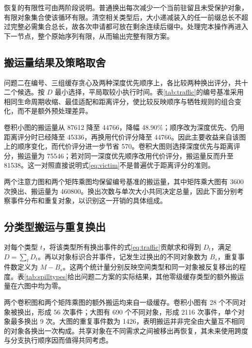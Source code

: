 恢复的有限性可由两阶段说明。普通换出每次减少一个当前驻留且未受保护对象，有限对象集合使该循环有限。清空相关类型后，大小递减装入的任一前缀总长不超过完整必需集合总长，故各次申请都可放在剩余连续后缀中。处理完本操作再进入下一节点，整个原始序列有限，从而输出完整有限方案。

\subsection{搬运量结果及策略取舍}
问题二在编号、三组缓存贪心及两种深度优先顺序上，各比较两种换出评分，共十二个候选。按 $D$ 最小选择，平局取较小执行时间。表\ref{tab:traffic}的编号基准采用相同生命周期收缩、最佳适配和距离评分，使比较反映顺序与牺牲规则的组合变化，而不是额外预处理差异。
\begin{table}[H]\centering\caption{问题二的额外搬运量与换出次数}\label{tab:traffic}\small
\end{table}

卷积小图的搬运量从 87612 降至 44766，降幅 48.90\%；顺序改为深度优先、仍用距离评分时已经降至 45336，再换用代价评分降至 44766。因此主要收益来自该图上的顺序变化，而代价评分进一步节省 570。卷积大图则选择深度优先与距离评分，搬运量为 75546；若对同一深度优先顺序改用代价评分，搬运量反而升至 81538。这一对照直接说明式\eqref{eq:victim}不是普遍优于距离评分的准则。

两个注意力图和两个矩阵乘图均保留编号基准的搬运量，其中矩阵乘大图有 3600 次换出、搬运量为 460800。换出次数与单次大小共同决定总量，因此下面分别考察事件分布和重复对象，以识别这一开销的具体组成。

\subsection{分类型搬运与重复换出}
对每个类型 $t$，将该类型所有换出事件的式\eqref{eq:traffic}贡献求和得到 $D_t$，满足 $D=\sum_tD_t$。再以对象标识合并事件，记发生过换出的不同对象数为 $B_s$，重复事件数定义为 $M-B_s$。这两个统计量分别反映空间类型和同一对象被反复移出的程度。表\ref{tab:spilltypes}给出问题二方案的实际结果，其他零级缓存类型的额外搬运量在六图中均为零。
\begin{table}[H]\centering\small
\caption{额外搬运的缓存类型与重复事件}\label{tab:spilltypes}
\end{table}

两个卷积图和两个矩阵乘图的额外搬运均来自一级缓存。卷积小图有 28 个不同对象被换出，形成 56 次事件；大图有 690 个不同对象，形成 2116 次事件，单个对象最多换出 9 次。大图的重复事件数为 1426，表明搬运并非完全由大量互不相同的对象各换出一次构成。共享对象在不同需求之间被移出再恢复，其未来使用跨度与分支执行顺序因而值得共同考虑。

